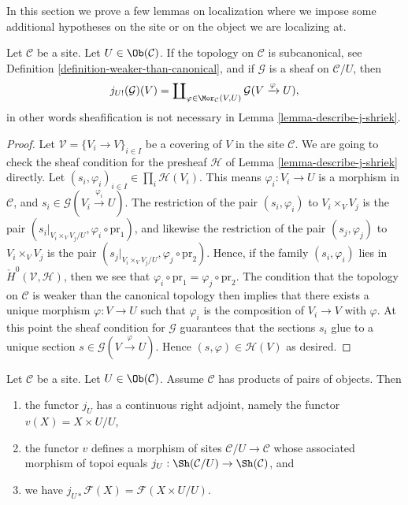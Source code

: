 \noindent
In this section we prove a few lemmas on localization where we
impose some additional hypotheses on the site or on the object
we are localizing at.

\begin{lemma}
\label{lemma-describe-j-shriek-good-site}
Let $\mathcal{C}$ be a site.
Let $U \in \Ob(\mathcal{C})$.
If the topology on $\mathcal{C}$ is subcanonical, see
Definition \ref{definition-weaker-than-canonical},
and if $\mathcal{G}$ is a sheaf on $\mathcal{C}/U$, then
$$
j_{U!}(\mathcal{G})(V)
=
\coprod\nolimits_{\varphi \in \Mor_\mathcal{C}(V, U)}
\mathcal{G}(V \xrightarrow{\varphi} U),
$$
in other words sheafification is not necessary in
Lemma \ref{lemma-describe-j-shriek}.
\end{lemma}

\begin{proof}
Let $\mathcal{V} = \{V_i \to V\}_{i \in I}$ be a covering of $V$
in the site $\mathcal{C}$.
We are going to check the sheaf condition for the presheaf $\mathcal{H}$
of Lemma \ref{lemma-describe-j-shriek} directly.
Let $(s_i, \varphi_i)_{i \in I} \in \prod_i \mathcal{H}(V_i)$.
This means $\varphi_i : V_i \to U$ is a morphism in $\mathcal{C}$, and
$s_i \in \mathcal{G}(V_i \xrightarrow{\varphi_i} U)$.
The restriction of the pair $(s_i, \varphi_i)$ to
$V_i \times_V V_j$ is the pair
$(s_i|_{V_i \times_V V_j/U}, \varphi_i \circ \text{pr}_1)$, and
likewise the restriction of the pair $(s_j, \varphi_j)$ to
$V_i \times_V V_j$ is the pair
$(s_j|_{V_i \times_V V_j/U}, \varphi_j \circ \text{pr}_2)$.
Hence, if the family $(s_i, \varphi_i)$ lies in
$\check{H}^0(\mathcal{V}, \mathcal{H})$, then we see that
$\varphi_i \circ \text{pr}_1 = \varphi_j \circ \text{pr}_2$.
The condition that the topology on $\mathcal{C}$ is weaker than the canonical
topology then implies that there exists a unique morphism
$\varphi : V \to U$ such that $\varphi_i$ is the composition
of $V_i \to V$ with $\varphi$. At this point the sheaf condition for
$\mathcal{G}$ guarantees that the sections $s_i$ glue to a unique
section $s \in \mathcal{G}(V \xrightarrow{\varphi} U)$.
Hence $(s, \varphi) \in \mathcal{H}(V)$ as desired.
\end{proof}

\begin{lemma}
\label{lemma-localize-given-products}
Let $\mathcal{C}$ be a site.
Let $U \in \Ob(\mathcal{C})$.
Assume $\mathcal{C}$ has products of pairs of objects.
Then
\begin{enumerate}
\item the functor $j_U$ has a continuous right adjoint,
namely the functor $v(X) = X \times U / U$,
\item the functor $v$ defines a morphism of sites
$\mathcal{C}/U \to \mathcal{C}$ whose associated morphism of topoi equals
$j_U : \Sh(\mathcal{C}/U) \to \Sh(\mathcal{C})$, and
\item we have $j_{U*}\mathcal{F}(X) = \mathcal{F}(X \times U/U)$.
\end{enumerate}
\end{lemma}

